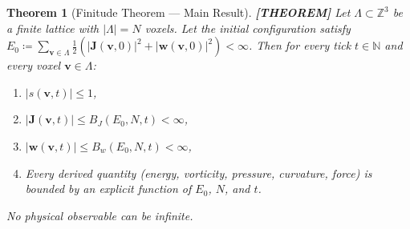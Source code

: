 \documentclass[11pt]{article}
\theoremstyle{tight}
\newtheorem{theorem}{Theorem}[section]
\theoremstyle{plainroman}
\newcommand{\Z}{\mathbb{Z}}
\newcommand{\N}{\mathbb{N}}
\begin{document}
\begin{theorem}[Finitude Theorem --- Main Result]\label{thm:finitude}
\textbf{[THEOREM]}
Let $\Lambda\subset\Z^3$ be a finite lattice with $|\Lambda|=N$ voxels.
Let the initial configuration satisfy $E_0\coloneqq\sum_{\mathbf v\in\Lambda}\frac{1}{2}(|\mathbf J(\mathbf v,0)|^2+|\mathbf w(\mathbf v,0)|^2)<\infty$.
Then for every tick $t\in\N$ and every voxel $\mathbf v\in\Lambda$:
\begin{enumerate}[nosep]
\item $|s(\mathbf v,t)|\le 1$,
\item $|\mathbf J(\mathbf v,t)|\le B_J(E_0,N,t)<\infty$,
\item $|\mathbf w(\mathbf v,t)|\le B_w(E_0,N,t)<\infty$,
\item Every derived quantity (energy, vorticity, pressure, curvature, force) is bounded by an explicit function of $E_0$, $N$, and $t$.
\end{enumerate}
No physical observable can be infinite.
\end{theorem}
\end{document}
